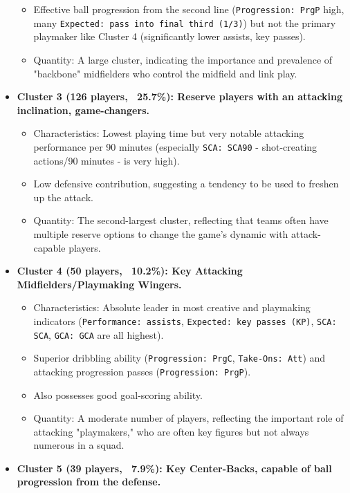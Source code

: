 \documentclass[12pt, a4paper]{report}
\begin{document}
\begin{itemize}
\begin{itemize}
        \item Effective ball progression from the second line (\texttt{Progression: PrgP} high, many \texttt{Expected: pass into final third (1/3)}) but not the primary playmaker like Cluster 4 (significantly lower assists, key passes).
        \item Quantity: A large cluster, indicating the importance and prevalence of "backbone" midfielders who control the midfield and link play.
    \end{itemize}
    \item \textbf{Cluster 3 (126 players, ~25.7\%): Reserve players with an attacking inclination, game-changers.}
    \begin{itemize}
        \item Characteristics: Lowest playing time but very notable attacking performance per 90 minutes (especially \texttt{SCA: SCA90} - shot-creating actions/90 minutes - is very high).
        \item Low defensive contribution, suggesting a tendency to be used to freshen up the attack.
        \item Quantity: The second-largest cluster, reflecting that teams often have multiple reserve options to change the game's dynamic with attack-capable players.
    \end{itemize}
    \item \textbf{Cluster 4 (50 players, ~10.2\%): Key Attacking Midfielders/Playmaking Wingers.}
    \begin{itemize}
        \item Characteristics: Absolute leader in most creative and playmaking indicators (\texttt{Performance: assists}, \texttt{Expected: key passes (KP)}, \texttt{SCA: SCA}, \texttt{GCA: GCA} are all highest).
        \item Superior dribbling ability (\texttt{Progression: PrgC}, \texttt{Take-Ons: Att}) and attacking progression passes (\texttt{Progression: PrgP}).
        \item Also possesses good goal-scoring ability.
        \item Quantity: A moderate number of players, reflecting the important role of attacking "playmakers," who are often key figures but not always numerous in a squad.
    \end{itemize}
    \item \textbf{Cluster 5 (39 players, ~7.9\%): Key Center-Backs, capable of ball progression from the defense.}
    \begin{itemize}

\end{itemize}
\end{itemize}
\end{document}
